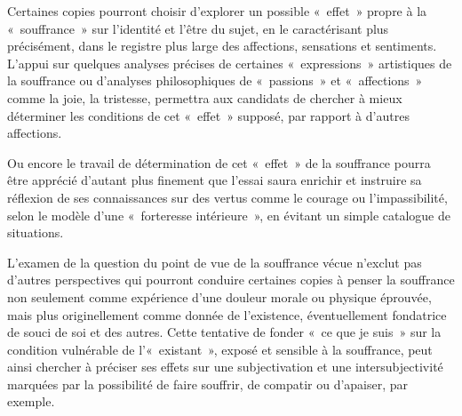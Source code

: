 {Certaines copies pourront choisir d'explorer un possible «~effet~» propre à la
«~souffrance~» sur l'identité et l'être du sujet, en le caractérisant plus précisément,
dans le registre plus large des affections, sensations et sentiments. L'appui sur
quelques analyses précises de certaines «~expressions~» artistiques de la souffrance
ou d'analyses philosophiques de «~passions~» et «~affections~» comme la joie, la
tristesse, permettra aux candidats de chercher à mieux déterminer les conditions de
cet «~effet~» supposé, par rapport à d'autres affections.

Ou encore le travail de détermination de cet «~effet~» de la souffrance pourra
être apprécié d'autant plus finement que l'essai saura enrichir et instruire sa réflexion
de ses connaissances sur des vertus comme le courage ou l'impassibilité, selon le
modèle d'une «~forteresse intérieure~», en évitant un simple catalogue de situations.

L'examen de la question du point de vue de la souffrance vécue n'exclut pas
d'autres perspectives qui pourront conduire certaines copies à penser la souffrance
non seulement comme expérience d'une douleur morale ou physique éprouvée, mais
plus originellement comme donnée de l'existence, éventuellement fondatrice de
souci de soi et des autres. Cette tentative de fonder «~ce que je suis~» sur la
condition vulnérable de l'«~existant~», exposé et sensible à la souffrance, peut ainsi
chercher à préciser ses effets sur une subjectivation et une intersubjectivité
marquées par la possibilité de faire souffrir, de compatir ou d'apaiser, par exemple.}

\vfill{~}\clearpage


